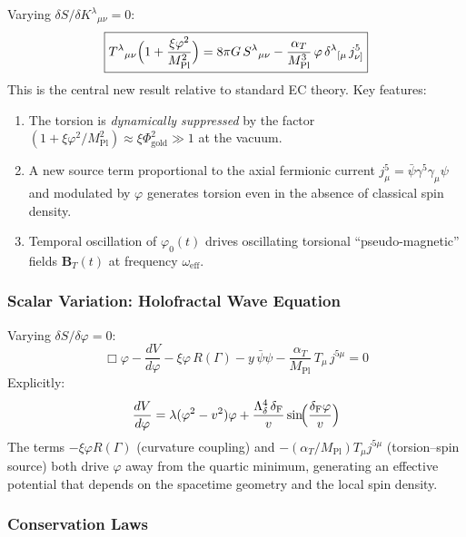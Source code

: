 \documentclass[12pt,a4paper]{article}
\newcommand{\MPl}{M_{\mathrm{Pl}}}
\newcommand{\tors}{T^{\lambda}{}_{\mu\nu}}
\newcommand{\spin}{S^{\lambda}{}_{\mu\nu}}
\newcommand{\Feig}{\delta_{\mathrm{F}}}
\newcommand{\BT}{\mathbf{B}_T}
\newcommand{\alphaT}{\alpha_T}
\numberwithin{equation}{section}
\begin{document}
Varying $\delta S/\delta K^\lambda{}_{\mu\nu} = 0$:
\begin{equation}
  \boxed{
  \tors\Bigl(1 + \frac{\xi\varphi^2}{\MPl^2}\Bigr)
  = 8\pi G\,\spin
  - \frac{\alphaT}{\MPl^3}\,\varphi\,\delta^\lambda{}_{[\mu}\,j^5_{\nu]}
  }
  \label{eq:torsion_TTH}
\end{equation}
This is the central new result relative to standard EC theory. Key features:
\begin{enumerate}[label=(\arabic*)]
\item The torsion is \emph{dynamically suppressed} by the factor
  $(1 + \xi\varphi^2/\MPl^2) \approx \xi\Phi_{\mathrm{gold}}^2 \gg 1$ at the vacuum.
\item A new source term proportional to the axial fermionic current
  $j^5_\mu = \bar\psi\gamma^5\gamma_\mu\psi$ and modulated by $\varphi$
  generates torsion even in the absence of classical spin density.
\item Temporal oscillation of $\varphi_0(t)$ drives oscillating torsional
  ``pseudo-magnetic'' fields $\BT(t)$ at frequency $\omega_{\mathrm{eff}}$.
\end{enumerate}

\subsubsection{Scalar Variation: Holofractal Wave Equation}

Varying $\delta S/\delta\varphi = 0$:
\begin{equation}
  \boxed{
  \Box\varphi - \frac{dV}{d\varphi} - \xi\varphi\,R(\Gamma)
  - y\,\bar\psi\psi
  - \frac{\alphaT}{\MPl}\,T_\mu\,j^{5\mu} = 0
  }
  \label{eq:phi_eom}
\end{equation}
Explicitly:
\begin{equation}
  \frac{dV}{d\varphi} = \lambda(\varphi^2 - v^2)\varphi
  + \frac{\Lambda_\delta^4\,\Feig}{v}\sin\!\Bigl(\frac{\Feig\varphi}{v}\Bigr)
  \label{eq:dV_dphi}
\end{equation}
The terms $-\xi\varphi R(\Gamma)$ (curvature coupling) and
$-(\alphaT/\MPl)T_\mu j^{5\mu}$ (torsion--spin source)
both drive $\varphi$ away from the quartic minimum, generating
an effective potential that depends on the spacetime geometry and
the local spin density.

\subsubsection{Conservation Laws}
\end{document}
